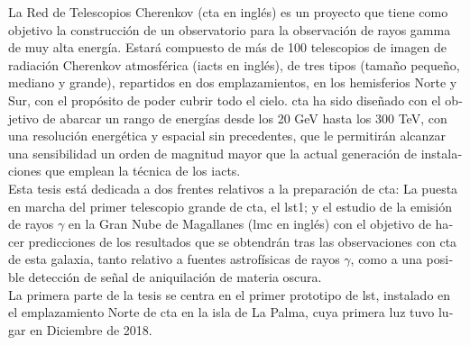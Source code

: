\documentclass[main.tex]{subfiles}
\begin{document}
\glsresetall
\begin{otherlanguage}{spanish}
La Red de Telescopios Cherenkov (\gls{cta} en inglés) es un proyecto que tiene como objetivo la construcción de un observatorio para la observación de rayos gamma de muy alta energía. Estará compuesto de más de 100 telescopios de imagen de radiación Cherenkov atmosférica (\glspl{iact} en inglés), de tres tipos (tamaño pequeño, mediano y grande), repartidos en dos emplazamientos, en los hemisferios Norte y Sur, con el propósito de poder cubrir todo el cielo. \gls{cta} ha sido diseñado con el objetivo de abarcar un rango de energías desde los 20 GeV hasta los 300 TeV, con una resolución energética y espacial sin precedentes,  que le permitirán alcanzar una sensibilidad un orden de magnitud mayor que la actual generación de instalaciones que emplean la técnica de los \glspl{iact}.\\
Esta tesis está dedicada a dos frentes relativos a la preparación de \gls{cta}: La puesta en marcha del primer telescopio grande de \gls{cta}, el \gls{lst}1; y el estudio de la emisión de rayos $\gamma$ en la Gran Nube de Magallanes (\gls{lmc} en inglés) con el objetivo de hacer predicciones de los resultados que se obtendrán tras las observaciones con \gls{cta} de esta galaxia, tanto relativo a fuentes astrofísicas de rayos $\gamma$, como a una posible detección de señal de aniquilación de materia oscura.\\   
La primera parte de la tesis se centra en el primer prototipo de \gls{lst}, instalado en el emplazamiento Norte de \gls{cta} en la isla de La Palma, cuya primera luz tuvo lugar en Diciembre de 2018.

\end{otherlanguage}
\end{document}
